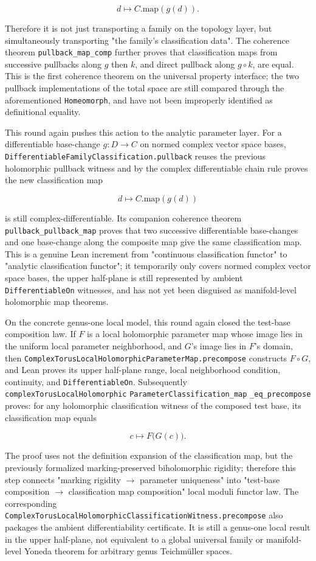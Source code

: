 \documentclass[UTF8,a4paper,11pt]{article}
\begin{document}
\[
  d\longmapsto C.\mathrm{map}(g(d)).
\]

Therefore it is not just transporting a family on the topology layer, but simultaneously transporting "the family's classification data". The coherence theorem
\texttt{pullback\_map\_comp} further proves that classification maps from successive pullbacks along
$g$ then $k$, and direct pullback along $g\circ k$, are equal. This is the first coherence theorem on the universal property interface; the two pullback implementations of the total space are still compared through the aforementioned \texttt{Homeomorph}, and have not been improperly identified as definitional equality.

This round again pushes this action to the analytic parameter layer. For a differentiable base-change
$g:D\to C$ on normed complex vector space bases,
\texttt{DifferentiableFamilyClassification.pullback} reuses the previous holomorphic pullback witness and by the complex differentiable chain rule proves the new classification map

\[
  d\longmapsto C.\mathrm{map}(g(d))
\]

is still complex-differentiable. Its companion coherence theorem
\texttt{pullback\_pullback\_map} proves that two successive differentiable base-changes and one base-change along the composite map give the same classification map. This is a genuine Lean increment from "continuous classification functor" to "analytic classification functor"; it temporarily only covers normed complex vector space bases, the upper half-plane is still represented by ambient
\texttt{DifferentiableOn} witnesses, and has not yet been disguised as manifold-level holomorphic map theorems.

On the concrete genus-one local model, this round again closed the test-base composition law. If
$F$ is a local holomorphic parameter map whose image lies in the uniform local parameter neighborhood, and
$G$'s image lies in $F$'s domain, then
\texttt{ComplexTorusLocalHolomorphicParameterMap.precompose} constructs
$F\circ G$, and Lean proves its upper half-plane range, local neighborhood condition, continuity, and
\texttt{DifferentiableOn}. Subsequently
\texttt{complexTorusLocalHolomorphic}
\allowbreak\texttt{ParameterClassification\_map}
\allowbreak\texttt{\_eq\_precompose}
proves: for any holomorphic classification witness of the composed test base, its classification map equals

\[
  c\longmapsto F\bigl(G(c)\bigr).
\]

The proof uses not the definition expansion of the classification map, but the previously formalized marking-preserved biholomorphic rigidity; therefore this step connects "marking rigidity \(\to\) parameter uniqueness" into "test-base composition \(\to\) classification map composition" local moduli functor law.
The corresponding \texttt{ComplexTorusLocalHolomorphicClassificationWitness.precompose}
also packages the ambient differentiability certificate. It is still a genus-one local result in the upper half-plane, not equivalent to a global universal family or manifold-level Yoneda theorem for arbitrary genus Teichmüller spaces.
\end{document}

